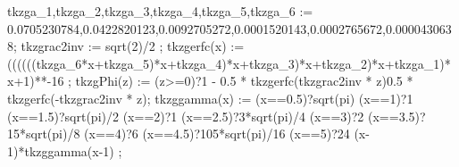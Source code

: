 \NewDocumentCommand{}
\NewCommandCopy\tkzgApproxSol\tkzgResolApproch

\NewDocumentCommand{}
\NewCommandCopy\tkzgGrowthRate\tkzgTauxAccroiss

\NewDocumentCommand{}

\xintdeffloatvar tkzga_1,tkzga_2,tkzga_3,tkzga_4,tkzga_5,tkzga_6 := 0.0705230784,0.0422820123,0.0092705272,0.0001520143,0.0002765672,0.0000430638;
\xintdeffloatvar tkzgrac2inv := sqrt(2)/2 ;
\xintdeffloatfunc tkzgerfc(x) := ((((((tkzga_6*x+tkzga_5)*x+tkzga_4)*x+tkzga_3)*x+tkzga_2)*x+tkzga_1)*x+1)**-16 ; %
\xintdeffloatfunc tkzgPhi(z) := (z>=0)?{1 - 0.5 * tkzgerfc(tkzgrac2inv * z)}{0.5 * tkzgerfc(-tkzgrac2inv * z)};
\xintdeffloatfunc tkzggamma(x) :=
  (x==0.5)?{sqrt(pi)}{%
  (x==1)?{1}{%
  (x==1.5)?{sqrt(pi)/2}{%
  (x==2)?{1}{%
  (x==2.5)?{3*sqrt(pi)/4}{%
  (x==3)?{2}{%
  (x==3.5)?{15*sqrt(pi)/8}{%
  (x==4)?{6}{%
  (x==4.5)?{105*sqrt(pi)/16}{%
  (x==5)?{24}{%
  (x-1)*tkzggamma(x-1)}}}}}}}}}} ;
  
